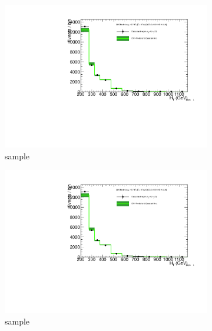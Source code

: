 \begin{figure}[h!]
\begin{subfigure}[b]{0.48\textwidth}
    \includegraphics[width=\textwidth,page=4]
    {Figs/results/v0/greenBand/bestFit_2012dev_RQcdZero_fZinvAll_0b_le3j-12p_smOnly}
    \caption{\mj sample}
  \end{subfigure}
  \begin{subfigure}[b]{0.48\textwidth}
    \includegraphics[width=\textwidth,page=8]
    {Figs/results/v0/greenBand/bestFit_2012dev_RQcdZero_fZinvAll_0b_le3j-12p_smOnly}
    \caption{\mmj sample}
  \end{subfigure}\\
  \begin{subfigure}[b]{0.48\textwidth}

\end{subfigure}
\end{figure}
